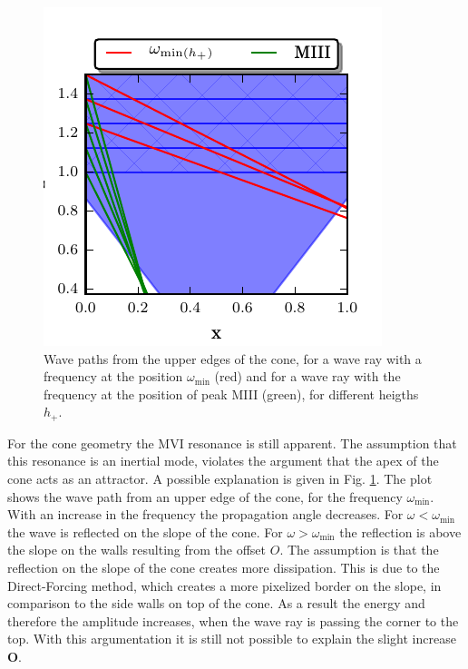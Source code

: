 \begin{figure}[!t]
  \begin{minipage}[c]{0.4\textwidth}
      \centering
      \includegraphics{gfx/cone/discussion/corners.pdf}
  \end{minipage}
  \hfill
  \begin{minipage}[c]{0.5\textwidth}
      \caption{\label{fig:conediscuss:corners}
        Wave paths from the upper edges of the cone,
        for a wave ray with a frequency at the position $\omega_{\text{min}}$ (red) and
        for a wave ray with the frequency at the position of peak M\RN{3} (green),
            for different heigths $h_+$.
      }
  \end{minipage}
\end{figure}



For the cone geometry the M\RN{6} resonance is still apparent.
The assumption that this resonance is an inertial mode,
violates the argument that the apex of the cone acts as
an attractor.
A possible explanation is given in Fig. \ref{fig:conediscuss:corners}.
The plot shows the wave path from an upper edge of the cone, for the frequency $\omega_{\text{min}}$.
With an increase in the frequency the propagation angle decreases.
For $\omega<\omega_{\text{min}}$ the wave is reflected on the slope of the cone.
For $\omega>\omega_{\text{min}}$ the reflection is above the slope on the walls resulting from the offset $O$.
The assumption is that the reflection on the slope of the cone creates more dissipation.
This is due to the Direct-Forcing method, which creates a more pixelized border on the slope,
in comparison to the side walls on top of the cone.
As a result the energy and therefore the amplitude increases,
when the wave ray is passing the corner to the top.
With this argumentation it is still not possible to explain the slight increase \textbf{O}.

